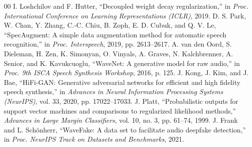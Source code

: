 \documentclass[conference]{IEEEtran}
\begin{document}
\begin{thebibliography}{00}
 I. Loshchilov and F. Hutter, ``Decoupled weight decay regularization,'' in \textit{Proc. International Conference on Learning Representations (ICLR)}, 2019.
 D. S. Park, W. Chan, Y. Zhang, C.-C. Chiu, B. Zoph, E. D. Cubuk, and Q. V. Le, ``SpecAugment: A simple data augmentation method for automatic speech recognition,'' in \textit{Proc. Interspeech}, 2019, pp. 2613--2617.
 A. van den Oord, S. Dieleman, H. Zen, K. Simonyan, O. Vinyals, A. Graves, N. Kalchbrenner, A. Senior, and K. Kavukcuoglu, ``WaveNet: A generative model for raw audio,'' in \textit{Proc. 9th ISCA Speech Synthesis Workshop}, 2016, p. 125.
 J. Kong, J. Kim, and J. Bae, ``HiFi-GAN: Generative adversarial networks for efficient and high fidelity speech synthesis,'' in \textit{Advances in Neural Information Processing Systems (NeurIPS)}, vol. 33, 2020, pp. 17022--17033.
 J. Platt, ``Probabilistic outputs for support vector machines and comparisons to regularized likelihood methods,'' \textit{Advances in Large Margin Classifiers}, vol. 10, no. 3, pp. 61--74, 1999.
 J. Frank and L. Sch\"onherr, ``WaveFake: A data set to facilitate audio deepfake detection,'' in \textit{Proc. NeurIPS Track on Datasets and Benchmarks}, 2021.
\end{thebibliography}
\end{document}
